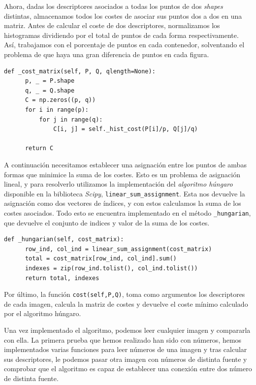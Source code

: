 \documentclass[size=a4, parskip=half, titlepage=false, toc=flat, toc=bib, 12pt]{scrartcl}
\begin{document}
Ahora, dadas los descriptores asociados a todas los puntos de dos \textit{shapes} distintas, almacenamos todos los costes de asociar sus puntos dos a dos en una matriz. Antes de calcular el coste de dos descriptores, normalizamos los histogramas dividiendo por el total de puntos de cada forma respectivamente. Así, trabajamos con el porcentaje de puntos en cada contenedor, solventando el problema de que haya una gran diferencia de puntos en cada figura.

\begin{verbatim}
def _cost_matrix(self, P, Q, qlength=None):
      p, _ = P.shape
      q, _ = Q.shape
      C = np.zeros((p, q))
      for i in range(p):
          for j in range(q):
              C[i, j] = self._hist_cost(P[i]/p, Q[j]/q)

      return C
\end{verbatim}

A continuación necesitamos establecer una asignación entre los puntos de ambas formas que minimice la suma de los costes. Esto es un problema de asignación lineal, y para resolverlo utilizamos la implementación del \textit{algoritmo húngaro} disponible en la biblioteca \textit{Scipy}, \texttt{linear\_sum\_assignment}. Esta nos devuelve la asignación como dos vectores de índices, y con estos calculamos la suma de los costes asociados. Todo esto se encuentra implementado en el método \texttt{\_hungarian}, que devuelve el conjunto de indices y valor de la suma de los costes.

\begin{verbatim}
def _hungarian(self, cost_matrix):
      row_ind, col_ind = linear_sum_assignment(cost_matrix)
      total = cost_matrix[row_ind, col_ind].sum()
      indexes = zip(row_ind.tolist(), col_ind.tolist())
      return total, indexes
\end{verbatim}

Por último, la función \texttt{cost(self,P,Q)}, toma como argumentos los descriptores de cada imagen, calcula la matriz de costes y devuelve el coste mínimo calculado por el algoritmo húngaro.

Una vez implementado el algoritmo, podemos leer cualquier imagen y compararla con ella. La primera prueba que hemos realizado han sido con números, hemos implementados varias funciones para leer números de una imagen y tras calcular sus descriptores, le podemos pasar otra imagen con números de distinta fuente y comprobar que el algoritmo es capaz de establecer una conexión entre dos número de distinta fuente.
\end{document}

